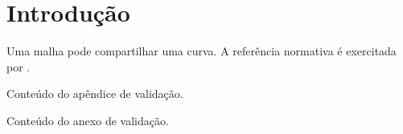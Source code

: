 \documentclass{abntexto-ufc}
\begin{document}
\pretextual
\ufcPrintTableOfContents

\textual
\section{Introdução}
Uma \gls{malha} pode compartilhar uma \gls{curva}.
A referência normativa é exercitada por \parencite{silva2020}.

\ufcPrintReferences
\ufcPrintGlossary

Conteúdo do apêndice de validação.

Conteúdo do anexo de validação.

\ufcPrintIndex
\end{document}
